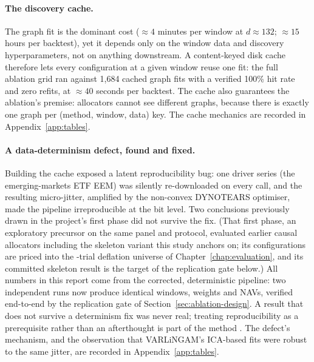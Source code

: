\paragraph{The discovery cache.} The graph fit is the dominant cost
(${\approx}4$ minutes per window at $d\approx132$; ${\approx}15$ hours
per backtest), yet it depends only on the window data and discovery
hyperparameters, not on anything downstream. A content-keyed disk cache
therefore lets every configuration at a given window reuse one fit: the
full ablation grid ran against 1{,}684 cached graph fits with a
verified 100\% hit rate and zero refits, at ${\approx}40$ seconds per
backtest. The cache also guarantees the ablation's premise: allocators
cannot see different graphs, because there is exactly one graph per
(method, window, data) key. The cache mechanics are recorded in
Appendix~\ref{app:tables}.

\paragraph{A data-determinism defect, found and fixed.} Building the cache
exposed a latent reproducibility bug: one driver series (the
emerging-markets ETF EEM) was silently re-downloaded on every call, and
the resulting micro-jitter, amplified by the non-convex DYNOTEARS
optimiser, made the pipeline irreproducible at the bit level. Two
conclusions previously drawn in the project's first phase did not
survive the fix. (That first phase, an exploratory precursor on the
same panel and protocol, evaluated earlier causal allocators including
the skeleton variant this study anchors on; its configurations are
priced into the \rsNtrials-trial deflation universe of
Chapter~\ref{chap:evaluation}, and its committed skeleton result is the
target of the replication gate below.) All numbers in this report come
from the corrected, deterministic pipeline: two independent runs now
produce identical windows, weights and NAVs, verified end-to-end by the
replication gate of Section~\ref{sec:ablation-design}. A result that does
not survive a determinism fix was never real; treating reproducibility as a
prerequisite rather than an afterthought is part of the method
\cite{lopezdeprado2023causal}. The defect's mechanism, and the
observation that VARLiNGAM's ICA-based fits were robust to the same
jitter, are recorded in Appendix~\ref{app:tables}.
